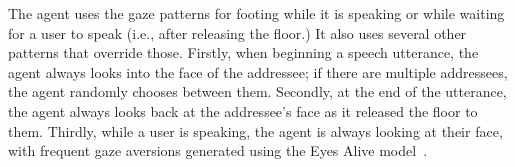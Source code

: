 The agent uses the gaze patterns for footing while it is speaking or while waiting for a user to speak (i.e., after releasing the floor.) It also uses several other patterns that override those. Firstly, when beginning a speech utterance, the agent always looks into the face of the addressee; if there are multiple addressees, the agent randomly chooses between them. Secondly, at the end of the utterance, the agent always looks back at the addressee's face as it released the floor to them. Thirdly, while a user is speaking, the agent is always looking at their face, with frequent gaze aversions generated using the Eyes Alive model~\citep{lee2002eyes}.